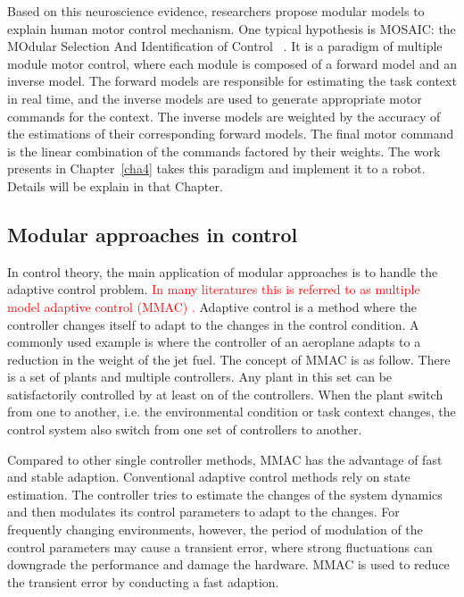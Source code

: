 Based on this neuroscience evidence, researchers propose modular models to explain human motor control mechanism. One typical hypothesis is MOSAIC: the MOdular Selection And Identification of Control ~\citep{haruno2001mosaic}. It is a paradigm of multiple module motor control, where each module is composed of a forward model and an inverse model. The forward models are responsible for estimating the task context in real time, and the inverse models are used to generate appropriate motor commands for the context. The inverse models are weighted by the accuracy of the estimations of their corresponding forward models. The final motor command is the linear combination of the commands factored by their weights. The work presents in Chapter~\ref{cha4} takes this paradigm and implement it to a robot. Details will be explain in that Chapter.



\subsection{Modular approaches in control}
\label{cha2:sec3:control}

In control theory, the main application of modular approaches is to handle the adaptive control problem. \textcolor{red}{In many literatures this is referred to as multiple model adaptive control (MMAC) \citep{athans1977stochastic,narendra1994improving,petkos2006learning}.} Adaptive control is a method where the controller changes itself to adapt to the changes in the control condition. A commonly used example is where the controller of an aeroplane adapts to a reduction in the weight of the jet fuel. The concept of MMAC is as follow. There is a set of plants and multiple controllers. Any plant in this set can be satisfactorily controlled by at least on of the controllers. When the plant switch from one to another, i.e. the environmental condition or task context changes, the control system also switch from one set of controllers to another.


Compared to other single controller methods, MMAC has the advantage of fast and stable adaption.
Conventional adaptive control methods rely on state estimation. The controller tries to estimate the changes of the system dynamics and then modulates its control parameters to adapt to the changes. For frequently changing environments, however, the period of modulation of the control parameters may cause a transient error, where strong fluctuations can downgrade the performance and damage the hardware. MMAC is used to reduce the transient error by conducting a fast adaption.

